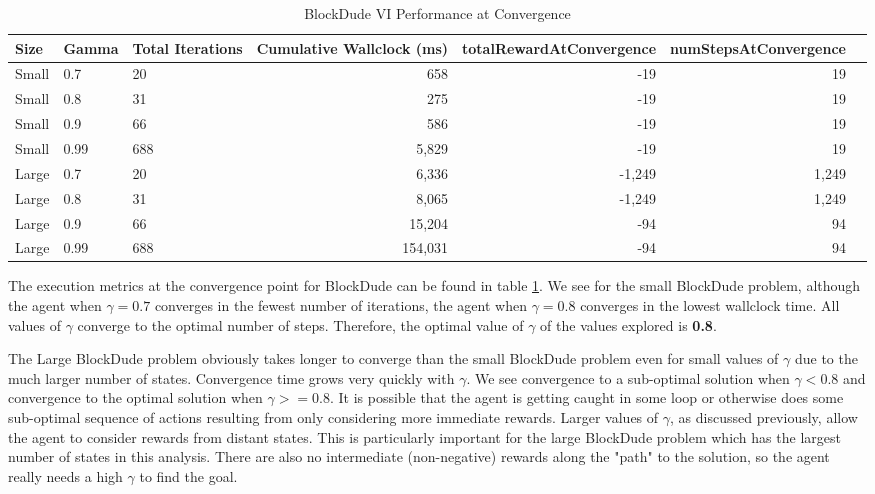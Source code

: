 \documentclass{article}
\begin{document}
\begin{table}
    \centering
    \caption{BlockDude VI Performance at Convergence}
    \label{table:bd-vi-execution}
    \begin{tabular}{lllrrrr}
        \toprule
        Size & Gamma &  Total Iterations &  Cumulative Wallclock (ms) &  totalRewardAtConvergence &  numStepsAtConvergence \\
        \midrule
        Small &         0.7 &    20 &               658 &                       -19 &                     19 \\
        Small &         0.8 &    31 &               275 &                       -19 &                     19 \\
        Small &         0.9 &    66 &               586 &                       -19 &                     19 \\
        Small &        0.99 &   688 &              5,829 &                       -19 &                     19 \\
        \midrule
        Large &         0.7 &    20 &              6,336 &                    -1,249 &                   1,249 \\
        Large &         0.8 &    31 &              8,065 &                    -1,249 &                   1,249 \\
        Large &         0.9 &    66 &             15,204 &                       -94 &                     94 \\
        Large &        0.99 &   688 &            154,031 &                       -94 &                     94 \\
        \bottomrule
        \end{tabular}
    \end{table}

The execution metrics at the convergence point for BlockDude can be found in table \ref{table:bd-vi-execution}. We
see for the small BlockDude problem, although the agent when $\gamma = 0.7$ converges in the fewest number of iterations,
the agent when $\gamma = 0.8$ converges in the lowest wallclock time. All values of $\gamma$ converge to the optimal
number of steps. Therefore, the optimal value of $\gamma$ of the values explored is \textbf{0.8}.

The Large BlockDude problem obviously takes longer to converge than the small BlockDude problem even for small values of $\gamma$
due to the much larger number of states. Convergence time grows very quickly with $\gamma$. We see convergence to a
sub-optimal solution when $\gamma < 0.8$ and convergence to the optimal solution when $\gamma >= 0.8$. It is possible that the
agent is getting caught in some loop or otherwise does some sub-optimal sequence of actions resulting from only considering more
immediate rewards. Larger values of $\gamma$, as discussed previously, allow the agent to consider rewards from distant states.
This is particularly important for the large BlockDude problem which has the largest number of states in this analysis. There
are also no intermediate  (non-negative) rewards along the "path" to the solution, so the agent really needs a high $\gamma$ to
find the goal.
\end{document}
